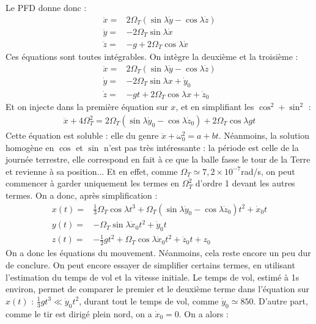 \documentclass{report}
\begin{document}
\begin{itemize}
Le PFD donne donc :
	\begin{align*}
        \ddot{x}=&2\Omega_T(\sin\lambda\dot{y}-\cos\lambda\dot{z})\\ 
        \ddot{y}=&-2\Omega_T\sin\lambda\dot{x} \\
        \ddot{z}=&-g+2\Omega_T\cos\lambda\dot{x}
	\end{align*}
Ces équations sont toutes intégrables. On intègre la deuxième et la troisième :
	\begin{align*}
        \ddot{x}=&2\Omega_T(\sin\lambda\dot{y}-\cos\lambda\dot{z})\\ 
        \dot{y}=&-2\Omega_T\sin\lambda x + \dot{y}_0 \\
        \dot{z}=&-gt+2\Omega_T\cos\lambda x + \dot{z}_0
	\end{align*}
Et on injecte dans la première équation sur $x$, et en simplifiant les $\cos^2+\sin^2$ : 
\begin{align*}
	\ddot{x}+4\Omega_T^2=2\Omega_T(\sin\lambda\dot{y}_0-\cos\lambda\dot{z}_0)+2\Omega_T\cos\lambda gt
\end{align*}
	Cette équation est soluble : elle du genre $\ddot{x}+\omega_0^2=a+bt$. Néanmoins, la solution homogène en $\cos$ et $\sin$ n'est pas très intéressante : la période est celle de la journée terrestre, elle correspond en fait à ce que la balle fasse le tour de la Terre et revienne à sa position... Et en effet, comme $\Omega_T\simeq7,2\times10^{-7}$rad/s, on peut commencer à garder uniquement les termes en $\Omega_T^2$ d'ordre 1 devant les autres termes. On a donc, après simplification :
	\begin{align*}
        x(t)=& \frac{1}{3}\Omega_T\cos\lambda t^3+\Omega_T(\sin\lambda\dot{y}_0-\cos\lambda\dot{z}_0)t^2+\dot{x}_0t\\ 
        y(t)=&-\Omega_T\sin\lambda \dot{x}_0t^2 + \dot{y}_0t \\
        z(t)=&-\frac{1}{2} gt^2+\Omega_T\cos\lambda \dot{x}_0t^2 + \dot{z}_0t+z_0
	\end{align*}	
On a donc les équations du mouvement. Néanmoins, cela reste encore un peu dur de conclure. On peut encore essayer de simplifier certains termes, en utilisant l'estimation du temps de vol et la vitesse initiale. Le temps de vol, estimé à 1s environ, permet de comparer le premier et le deuxième terme dans l'équation sur $x(t)$ : $\frac{1}{3}gt^3\ll\dot{y}_0t^2$, durant tout le temps de vol, comme $\dot{y}_0\simeq 850$. D'autre part, comme le tir est dirigé plein nord, on a $\dot{x}_0=0$. On a alors :
	\begin{align*}

\end{align*}
\end{itemize}
\end{document}
